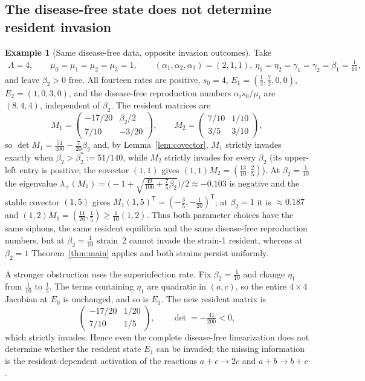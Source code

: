 \documentclass[11pt,a4paper]{article}
\theoremstyle{plain}
\theoremstyle{definition}
\newtheorem{example}[theorem]{Example}
\theoremstyle{remark}
\newcommand{\mat}[4]{\begin{pmatrix}#1&#2\\#3&#4\end{pmatrix}}
\begin{document}
\subsection{The disease-free state does not determine resident invasion}

\begin{example}[Same disease-free data, opposite invasion outcomes]\label{ex:obstruction}
Take
\begin{gather*}
 \Lambda=4,\qquad \mu_0=\mu_1=\mu_2=\mu_3=1,\qquad
 (\alpha_1,\alpha_2,\alpha_3)=(2,1,1),\
 \eta_1=\eta_2=\gamma_1=\gamma_2=\beta_1=\tfrac1{10},
\end{gather*}
and leave $\beta_2>0$ free. All fourteen rates are positive, $s_0=4$, $E_1=(\tfrac12,\tfrac72,0,0)$, $E_2=(1,0,3,0)$, and the disease-free reproduction numbers $\alpha_is_0/\mu_i$ are $(8,4,4)$, independent of $\beta_2$. The resident matrices are
\[
 M_1=\mat{-17/20}{\beta_2/2}{7/10}{-3/20},\qquad
 M_2=\mat{7/10}{1/10}{3/5}{3/10},
\]
so $\det M_1=\tfrac{51}{400}-\tfrac{7}{20}\beta_2$ and, by Lemma~\ref{lem:covector}, $M_1$ strictly invades exactly when $\beta_2>\beta_2^*:=51/140$, while $M_2$ strictly invades for every $\beta_2$ (its upper-left entry is positive; the covector $(1,1)$ gives $(1,1)M_2=(\tfrac{13}{10},\tfrac25)$). At $\beta_2=\tfrac1{10}$ the eigenvalue $\lambda_+(M_1)=\bigl(-1+\sqrt{\tfrac{49}{100}+\tfrac{7}{5}\beta_2}\bigr)/2\approx-0.103$ is negative and the stable covector $(1,5)$ gives $M_1(1,5)^{\mathsf T}=(-\tfrac35,-\tfrac1{20})^{\mathsf T}$; at $\beta_2=1$ it is $\approx0.187$ and $(1,2)M_1=(\tfrac{11}{20},\tfrac15)\ge\tfrac1{10}(1,2)$. Thus both parameter choices have the same siphons, the same resident equilibria and the same disease-free reproduction numbers, but at $\beta_2=\tfrac1{10}$ strain~2 cannot invade the strain-1 resident, whereas at $\beta_2=1$ Theorem~\ref{thm:main} applies and both strains persist uniformly.

A stronger obstruction uses the superinfection rate. Fix $\beta_2=\tfrac1{10}$ and change $\eta_1$ from $\tfrac1{10}$ to $\tfrac15$. The terms containing $\eta_1$ are quadratic in $(a,c)$, so the entire $4\times4$ Jacobian at $E_0$ is unchanged, and so is $E_1$. The new resident matrix is
\[
 \mat{-17/20}{1/20}{7/10}{1/5},\qquad \det=-\tfrac{41}{200}<0,
\]
which strictly invades. Hence even the complete disease-free linearization does not determine whether the resident state $E_1$ can be invaded; the missing information is the resident-dependent activation of the reactions $a+c\to2c$ and $a+b\to b+c$.
\end{example}
\end{document}
